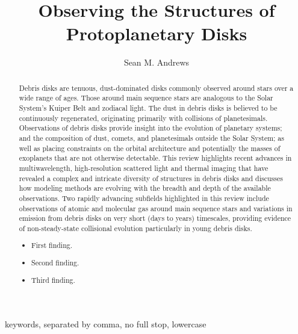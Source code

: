 \documentclass[a4paper]{ar-1col}
\begin{document}

\title{Observing the Structures of Protoplanetary Disks}


\author{Sean M. Andrews
}

\begin{abstract}
Debris disks are tenuous, dust-dominated disks commonly observed around
stars over a wide range of ages. Those around main sequence stars are analogous
to the Solar System’s Kuiper Belt and zodiacal light. The dust in debris
disks is believed to be continuously regenerated, originating primarily with
collisions of planetesimals. Observations of debris disks provide insight into
the evolution of planetary systems; and the composition of dust, comets,
and planetesimals outside the Solar System; as well as placing constraints
on the orbital architecture and potentially the masses of exoplanets that are
not otherwise detectable. This review highlights recent advances in multiwavelength,
high-resolution scattered light and thermal imaging that have
revealed a complex and intricate diversity of structures in debris disks and
discusses how modeling methods are evolving with the breadth and depth of
the available observations. Two rapidly advancing subfields highlighted in
this review include observations of atomic and molecular gas around main
sequence stars and variations in emission from debris disks on very short
(days to years) timescales, providing evidence of non-steady-state collisional
evolution particularly in young debris disks.
\begin{itemize}
\item First finding.
\item Second finding.
\item Third finding.
\end{itemize}
\end{abstract}

\begin{keywords}
keywords, separated by comma, no full stop, lowercase
\end{keywords}
\maketitle

\tableofcontents
\end{document}
